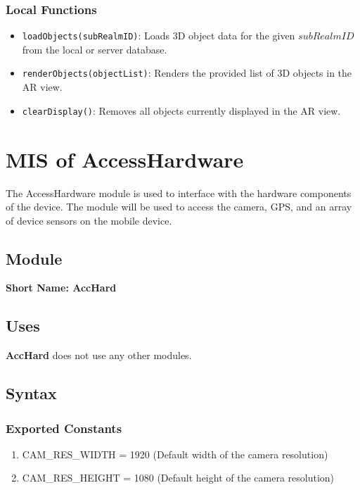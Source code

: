 \documentclass[12pt, titlepage]{article}
\begin{document}
\subsubsection{Local Functions}

\begin{itemize}
  \item \texttt{loadObjects(subRealmID)}: Loads 3D object data for the given \( subRealmID \) from the local or server database.
  \item \texttt{renderObjects(objectList)}: Renders the provided list of 3D objects in the AR view.
  \item \texttt{clearDisplay()}: Removes all objects currently displayed in the AR view.
\end{itemize}

\newpage

\section{MIS of AccessHardware} \label{mod-hardware}

The AccessHardware module is used to interface with the hardware components of the device. The module will be used to access the camera, GPS, and an array of device sensors on the mobile device.

\subsection{Module}

\textbf{Short Name: AccHard}

\subsection{Uses}

\textbf{AccHard} does not use any other modules.

\subsection{Syntax}

\subsubsection{Exported Constants}
\begin{enumerate}
  \item CAM\_RES\_WIDTH = 1920 (Default width of the camera resolution)
  \item CAM\_RES\_HEIGHT = 1080 (Default height of the camera resolution)
\end{enumerate}
\end{document}
